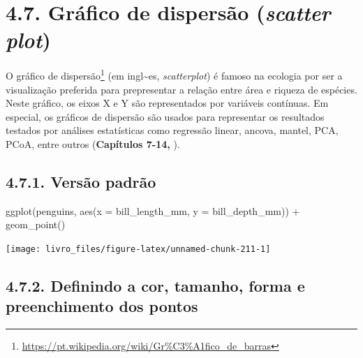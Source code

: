 \documentclass[
]{book}
\newenvironment{Shaded}{\begin{snugshade}}{\end{snugshade}}
\newcommand{\AttributeTok}[1]{\textcolor[rgb]{0.61,0.61,0.61}{#1}}
\newcommand{\FunctionTok}[1]{\textcolor[rgb]{0,0,0}{#1}}
\newcommand{\NormalTok}[1]{#1}
\newcommand{\SpecialCharTok}[1]{\textcolor[rgb]{0,0,0}{#1}}
\renewcommand{\href}[2]{#2\footnote{\url{#1}}}
\begin{document}
\hypertarget{gruxe1fico-de-dispersuxe3o-scatter-plot}{%
\section{\texorpdfstring{4.7. Gráfico de dispersão (\emph{scatter plot})}{4.7. Gráfico de dispersão (scatter plot)}}\label{gruxe1fico-de-dispersuxe3o-scatter-plot}}

O \href{https://pt.wikipedia.org/wiki/Gr\%C3\%A1fico_de_barras}{gráfico de dispersão} (em ingl\textasciitilde es, \emph{scatterplot}) é famoso na ecologia por ser a visualização preferida para prepresentar a relação entre área e riqueza de espécies. Neste gráfico, os eixos X e Y são representados por variáveis contínuas. Em especial, os gráficos de dispersão são usados para representar os resultados testados por análises estatísticas como regressão linear, ancova, mantel, PCA, PCoA, entre outros (\textbf{Capítulos 7-14,} ).

\hypertarget{versuxe3o-padruxe3o-5}{%
\subsection{4.7.1. Versão padrão}\label{versuxe3o-padruxe3o-5}}

\begin{Shaded}
\begin{Highlighting}[]

\FunctionTok{ggplot}\NormalTok{(penguins, }
       \FunctionTok{aes}\NormalTok{(}\AttributeTok{x =}\NormalTok{ bill\_length\_mm, }\AttributeTok{y =}\NormalTok{ bill\_depth\_mm)) }\SpecialCharTok{+}
  \FunctionTok{geom\_point}\NormalTok{()}
\end{Highlighting}
\end{Shaded}

\begin{center}\texttt{[image: livro\_files/figure-latex/unnamed-chunk-211-1]} \end{center}

\hypertarget{definindo-a-cor-tamanho-forma-e-preenchimento-dos-pontos}{%
\subsection{4.7.2. Definindo a cor, tamanho, forma e preenchimento dos pontos}\label{definindo-a-cor-tamanho-forma-e-preenchimento-dos-pontos}}
\end{document}

